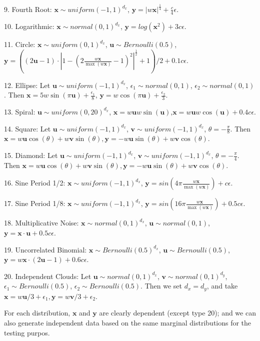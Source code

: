 \documentclass[11pt]{article}
\providecommand{\mb}[1]{\boldsymbol{#1}}
\begin{document}
9. Fourth Root: $\mb{x} \sim uniform(-1,1)^{d_{x}}$, $\mb{y}=|w\mb{x}|^\frac{1}{4}+\frac{c}{4}\epsilon$.

10. Logarithmic: $\mb{x} \sim normal(0, 1)^{d_{x}}$, $\mb{y}=log(\mb{x}^2)+3c\epsilon$.

11. Circle: $\mb{x} \sim uniform(0,1)^{d_{x}}$, $\mb{u} \sim Bernoulli(0.5)$, $\mb{y}=((2\mb{u}-1) \cdot |1-(2\frac{w\mb{x}}{\max(w\mb{x})}-1)^2|^{\frac{1}{2}}+1)/2+0.1c\epsilon$.

12. Ellipse: Let $\mb{u} \sim uniform(-1,1)^{d_{x}}$, $\epsilon_{1} \sim normal(0,1)$, $\epsilon_{2} \sim normal(0,1)$. Then $\mb{x}=5w\sin(\pi \mb{u})+\frac{\epsilon_{1}}{8}$, $\mb{y}=w\cos(\pi \mb{u})+\frac{\epsilon_{2}}{3}$. 

13. Spiral: $\mb{u} \sim uniform(0,20)^{d_{x}}$, $\mb{x}=w\mb{u}w\sin(\mb{u})$,$\mb{x}=w\mb{u}w\cos(\mb{u})+0.4c\epsilon$. 

14. Square: Let $\mb{u} \sim uniform(-1,1)^{d_{x}}$, $\mb{v} \sim uniform(-1,1)^{d_{x}}$, $\theta=-\frac{\pi}{8}$. Then $\mb{x}=w\mb{u} \cos(\theta) + w\mb{v} \sin(\theta), \mb{y}=-w\mb{u} \sin(\theta) + w\mb{v} \cos(\theta)$. 

15. Diamond: Let $\mb{u} \sim uniform(-1,1)^{d_{x}}$, $\mb{v} \sim uniform(-1,1)^{d_{x}}$, $\theta=-\frac{\pi}{4}$. Then $\mb{x}=w\mb{u} \cos(\theta) + w\mb{v} \sin(\theta), \mb{y}=-w\mb{u} \sin(\theta) + w\mb{v} \cos(\theta)$. 

16. Sine Period 1/2: $\mb{x} \sim uniform(-1,1)^{d_{x}}$, $\mb{y}=sin(4\pi \frac{w\mb{x}}{\max(w\mb{x})})+c\epsilon$.

17. Sine Period 1/8: $\mb{x} \sim uniform(-1,1)^{d_{x}}$, $\mb{y}=sin(16\pi \frac{w\mb{x}}{\max(w\mb{x})})+0.5c\epsilon$.    

18. Multiplicative Noise: $\mb{x} \sim normal(0, 1)^{d_{x}}$, $\mb{u} \sim normal(0, 1)$, $\mb{y}=\mb{x} \cdot \mb{u}+0.5c\epsilon$.

19. Uncorrelated Binomial: $\mb{x} \sim Bernoulli(0.5)^{d_{x}}$, $\mb{u} \sim Bernoulli(0.5)$, $\mb{y}=w\mb{x} \cdot (2\mb{u}-1)+0.6c\epsilon$.

20. Independent Clouds: Let $\mb{u} \sim normal(0,1)^{d_{x}}$, $\mb{v} \sim normal(0,1)^{d_{y}}$, $\epsilon_{1} \sim Bernoulli(0.5)$, $\epsilon_{2} \sim Bernoulli(0.5)$. Then we set $d_{x}=d_{y}$, and take $\mb{x}=w\mb{u}/3+\epsilon_{1}, \mb{y}=w\mb{v}/3+\epsilon_{2}$.

For each distribution, $\mb{x}$ and $\mb{y}$ are clearly dependent (except type 20); and we can also generate independent data based on the same marginal distributions for the testing purpos. 
\end{document}
